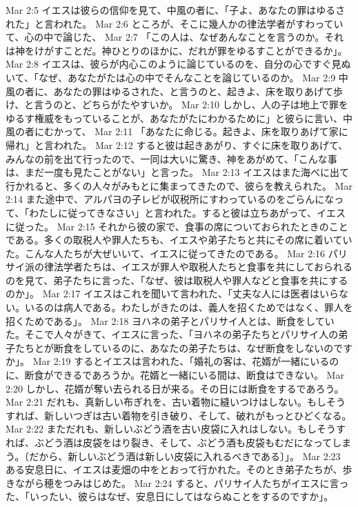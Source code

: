Mar 2:5  イエスは彼らの信仰を見て、中風の者に、「子よ、あなたの罪はゆるされた」と言われた。
Mar 2:6  ところが、そこに幾人かの律法学者がすわっていて、心の中で論じた、
Mar 2:7  「この人は、なぜあんなことを言うのか。それは神をけがすことだ。神ひとりのほかに、だれが罪をゆるすことができるか」。
Mar 2:8  イエスは、彼らが内心このように論じているのを、自分の心ですぐ見ぬいて、「なぜ、あなたがたは心の中でそんなことを論じているのか。
Mar 2:9  中風の者に、あなたの罪はゆるされた、と言うのと、起きよ、床を取りあげて歩け、と言うのと、どちらがたやすいか。
Mar 2:10  しかし、人の子は地上で罪をゆるす権威をもっていることが、あなたがたにわかるために」と彼らに言い、中風の者にむかって、
Mar 2:11  「あなたに命じる。起きよ、床を取りあげて家に帰れ」と言われた。
Mar 2:12  すると彼は起きあがり、すぐに床を取りあげて、みんなの前を出て行ったので、一同は大いに驚き、神をあがめて、「こんな事は、まだ一度も見たことがない」と言った。
Mar 2:13  イエスはまた海べに出て行かれると、多くの人々がみもとに集まってきたので、彼らを教えられた。
Mar 2:14  また途中で、アルパヨの子レビが収税所にすわっているのをごらんになって、「わたしに従ってきなさい」と言われた。すると彼は立ちあがって、イエスに従った。
Mar 2:15  それから彼の家で、食事の席についておられたときのことである。多くの取税人や罪人たちも、イエスや弟子たちと共にその席に着いていた。こんな人たちが大ぜいいて、イエスに従ってきたのである。
Mar 2:16  パリサイ派の律法学者たちは、イエスが罪人や取税人たちと食事を共にしておられるのを見て、弟子たちに言った、「なぜ、彼は取税人や罪人などと食事を共にするのか」。
Mar 2:17  イエスはこれを聞いて言われた、「丈夫な人には医者はいらない。いるのは病人である。わたしがきたのは、義人を招くためではなく、罪人を招くためである」。
Mar 2:18  ヨハネの弟子とパリサイ人とは、断食をしていた。そこで人々がきて、イエスに言った、「ヨハネの弟子たちとパリサイ人の弟子たちとが断食をしているのに、あなたの弟子たちは、なぜ断食をしないのですか」。
Mar 2:19  するとイエスは言われた、「婚礼の客は、花婿が一緒にいるのに、断食ができるであろうか。花婿と一緒にいる間は、断食はできない。
Mar 2:20  しかし、花婿が奪い去られる日が来る。その日には断食をするであろう。
Mar 2:21  だれも、真新しい布ぎれを、古い着物に縫いつけはしない。もしそうすれば、新しいつぎは古い着物を引き破り、そして、破れがもっとひどくなる。
Mar 2:22  まただれも、新しいぶどう酒を古い皮袋に入れはしない。もしそうすれば、ぶどう酒は皮袋をはり裂き、そして、ぶどう酒も皮袋もむだになってしまう。〔だから、新しいぶどう酒は新しい皮袋に入れるべきである〕」。
Mar 2:23  ある安息日に、イエスは麦畑の中をとおって行かれた。そのとき弟子たちが、歩きながら穂をつみはじめた。
Mar 2:24  すると、パリサイ人たちがイエスに言った、「いったい、彼らはなぜ、安息日にしてはならぬことをするのですか」。
